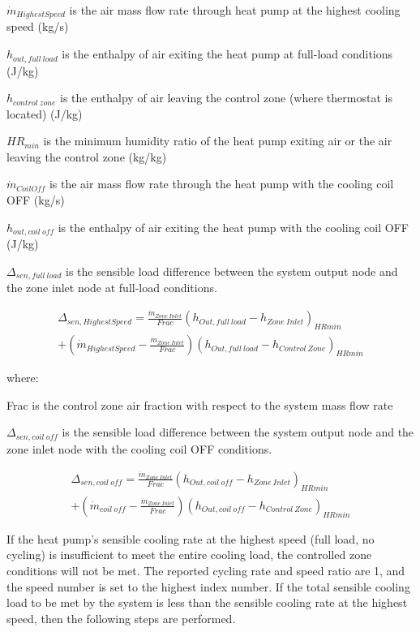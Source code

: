 \({\dot m}_{HighestSpeed}\) is the air mass flow rate through heat pump at the highest cooling speed (kg/s)

\(h_{out,full~load}\) is the enthalpy of air exiting the heat pump at full-load conditions (J/kg)

\(h_{control~zone}\) is the enthalpy of air leaving the control zone (where thermostat is located) (J/kg)

\(HR_{min}\) is the minimum humidity ratio of the heat pump exiting air or the air leaving the control zone (kg/kg)

\({\dot m}_{CoilOff}\) is the air mass flow rate through the heat pump with the cooling coil OFF (kg/s)

\(h_{out,coil~off}\) is the enthalpy of air exiting the heat pump with the cooling coil OFF (J/kg)

\(\Delta_{sen,full~load}\) is the sensible load difference between the system output node and the zone inlet node at full-load conditions.

\begin{equation}
\begin{split}
{\Delta_{sen,HighestSpeed}} = \frac{{{{\dot m}_{Zone~Inlet}}}}{Frac}{\left( {{h_{Out,full~load}} - {h_{Zone~Inlet}}} \right)_{HRmin}} \\
+ \left( {{{\dot m}_{HighestSpeed}} - \frac{{{{\dot m}_{Zone~Inlet}}}}{Frac}} \right){\left( {h_{Out,full~load} - {h_{Control~Zone}}} \right)_{HRmin}}
\end{split}
\end{equation}

where:

Frac is the control zone air fraction with respect to the system mass flow rate

\(\Delta_{sen,coil~off}\) is the sensible load difference between the system output node and the zone inlet node with the cooling coil OFF conditions.

\begin{equation}
\begin{split}
{\Delta_{sen,coil~off}} = \frac{{{{\dot m}_{Zone~Inlet}}}}{{Frac}}{\left( {{h_{Out,coil~off}} - {h_{Zone~Inlet}}} \right)_{HRmin}} \\ 
+ \left( {{{\dot m}_{coil~off}} - \frac{{{{\dot m}_{Zone~Inlet}}}}{{Frac}}} \right){\left( {{h_{Out,coil~off}} - {h_{Control~Zone}}} \right)_{HRmin}}
\end{split}
\end{equation}

If the heat pump's sensible cooling rate at the highest speed (full load, no cycling) is insufficient to meet the entire cooling load, the controlled zone conditions will not be met. The reported cycling rate and speed ratio are 1, and the speed number is set to the highest index number. If the total sensible cooling load to be met by the system is less than the sensible cooling rate at the highest speed, then the following steps are performed.

